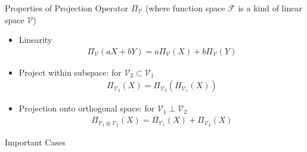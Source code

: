 \begin{point}
    Properties of Projection Operator $ \Pi_{\mathcal{V}} $ (where function space $ \mathscr{F} $ is a kind of linear space $ \mathcal{V} $)
\end{point}
\begin{itemize}[topsep=2pt,itemsep=0pt]
    \item Linearity
    \begin{align*}
        \Pi_{\mathcal{V}}(aX+bY)=a\Pi_{\mathcal{V}}(X)+b\Pi_{\mathcal{V}}(Y)
    \end{align*}
    \item Project within subspace: for $\mathcal{V}_2\subset \mathcal{V}_1 $
    \begin{align*}
        \Pi_{\mathcal{V}_2}(X)=\Pi_{\mathcal{V}_2}\left(\Pi_{\mathcal{V}_1}(X)\right) 
    \end{align*}
    \item Projection onto orthogonal space: for $ \mathcal{V}_1\perp\mathcal{V}_2 $
    \begin{align*}
        \Pi_{\mathcal{V}_1\oplus\mathcal{V}_2}(X)=\Pi_{\mathcal{V}_1}(X)+\Pi_{\mathcal{V}_2}(X) 
    \end{align*}
\end{itemize}

\begin{point}
    Important Cases
\end{point}

